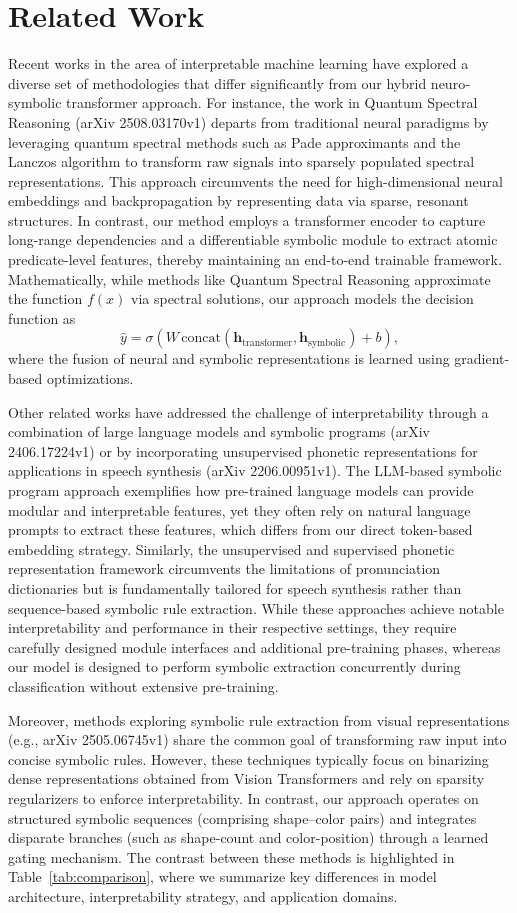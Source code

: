 \documentclass{article}
\begin{document}
\section{Related Work}
Recent works in the area of interpretable machine learning have explored a diverse set of methodologies that differ significantly from our hybrid neuro‐symbolic transformer approach. For instance, the work in Quantum Spectral Reasoning (arXiv 2508.03170v1) departs from traditional neural paradigms by leveraging quantum spectral methods such as Pade approximants and the Lanczos algorithm to transform raw signals into sparsely populated spectral representations. This approach circumvents the need for high-dimensional neural embeddings and backpropagation by representing data via sparse, resonant structures. In contrast, our method employs a transformer encoder to capture long-range dependencies and a differentiable symbolic module to extract atomic predicate-level features, thereby maintaining an end-to-end trainable framework. Mathematically, while methods like Quantum Spectral Reasoning approximate the function \( f(x) \) via spectral solutions, our approach models the decision function as 
\[
\hat{y} = \sigma(W\, \text{concat}(\mathbf{h}_{\text{transformer}},\mathbf{h}_{\text{symbolic}}) + b),
\]
where the fusion of neural and symbolic representations is learned using gradient-based optimizations.

Other related works have addressed the challenge of interpretability through a combination of large language models and symbolic programs (arXiv 2406.17224v1) or by incorporating unsupervised phonetic representations for applications in speech synthesis (arXiv 2206.00951v1). The LLM-based symbolic program approach exemplifies how pre-trained language models can provide modular and interpretable features, yet they often rely on natural language prompts to extract these features, which differs from our direct token-based embedding strategy. Similarly, the unsupervised and supervised phonetic representation framework circumvents the limitations of pronunciation dictionaries but is fundamentally tailored for speech synthesis rather than sequence-based symbolic rule extraction. While these approaches achieve notable interpretability and performance in their respective settings, they require carefully designed module interfaces and additional pre-training phases, whereas our model is designed to perform symbolic extraction concurrently during classification without extensive pre-training.

Moreover, methods exploring symbolic rule extraction from visual representations (e.g., arXiv 2505.06745v1) share the common goal of transforming raw input into concise symbolic rules. However, these techniques typically focus on binarizing dense representations obtained from Vision Transformers and rely on sparsity regularizers to enforce interpretability. In contrast, our approach operates on structured symbolic sequences (comprising shape–color pairs) and integrates disparate branches (such as shape-count and color-position) through a learned gating mechanism. The contrast between these methods is highlighted in Table~\ref{tab:comparison}, where we summarize key differences in model architecture, interpretability strategy, and application domains.
\end{document}
